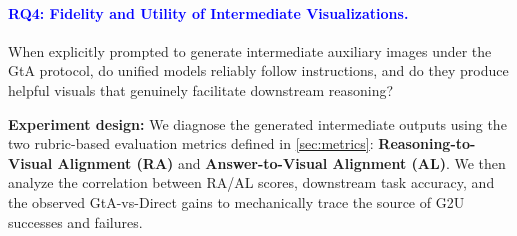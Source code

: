 \documentclass{article}
\theoremstyle{plain}
\theoremstyle{definition}
\theoremstyle{remark}
\begin{document}
\paragraph{\textcolor{blue}{RQ4: Fidelity and Utility of Intermediate Visualizations.}}
When explicitly prompted to generate intermediate auxiliary images under the GtA protocol, do unified models reliably follow instructions, and do they produce helpful visuals that genuinely facilitate downstream reasoning?
\par\noindent\textbf{Experiment design:} We diagnose the generated intermediate outputs using the two rubric-based evaluation metrics defined in \cref{sec:metrics}: \textbf{Reasoning-to-Visual Alignment (RA)} and \textbf{Answer-to-Visual Alignment (AL)}. We then analyze the correlation between RA/AL scores, downstream task accuracy, and the observed GtA-vs-Direct gains to mechanically trace the source of G2U successes and failures.


\end{document}
